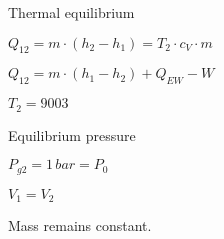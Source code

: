 Thermal equilibrium  

\( Q_{12} = m \cdot (h_2 - h_1) = T_2 \cdot c_V \cdot m \)  

\( Q_{12} = m \cdot (h_1 - h_2) + Q_{EW} - W \)  

\( T_2 = 9003 \)  

Equilibrium pressure  

\( P_{g2} = 1 \, bar = P_0 \)  

\( V_1 = V_2 \)  

Mass remains constant.